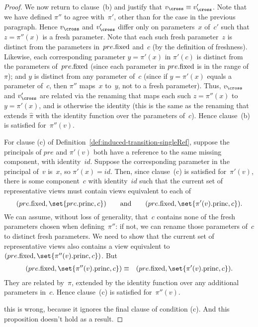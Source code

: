 \begin{proof}
We now return to clause~(b) and justify that $v_\cross \equiv v_\cross'$.
Note that we have defined $\pi''$ to agree with~$\pi'$, other than for the
case in the previous paragraph.  Hence $v_\cross$ and $v_\cross'$ differ only
on parameters~$x$ of~$c'$ such that $z = \pi''(x)$ is a fresh parameter.  Note
that each such fresh parameter~$z$ is distinct from the parameters
in~$pre.\mathrm{fixed}$ and~$c$ (by the definition of freshness).
%
Likewise, each corresponding parameter $y = \pi'(x)$ in $\pi'(c)$ is distinct
from the parameters of~$pre.\mathrm{fixed}$ (since each parameter in $pre.\mathrm{fixed}$ is
in the range of~$\pi$); and $y$ is distinct from any parameter of~$c$
(since if $y = \pi'(x)$ equals a parameter of~$c$, then $\pi''$ maps~$x$
to~$y$, not to a fresh parameter).
%
Thus, $v_\cross$ and $v_\cross'$ are related via the renaming that maps each
such $z = \pi''(x)$ to~$y = \pi'(x)$, and is otherwise the identity (this is
the same as the renaming that extends $\hat\pi$ with the identity function
over the parameters of~$c$).  Hence clause~(b) is satisfied for~$\pi''(v)$.

For clause (c) of Definition~\ref{def:induced-transition-singleRef}, suppose
the principals of $pre$ and $\pi'(v)$ both have a reference to the same
missing component, with identity~$id$.  Suppose the corresponding parameter in
the principal of~$v$ is~$x$, so $\pi'(x) = id$.  Then, since clause~(c) is
satisfied for~$\pi'(v)$, there is some component~$c$ with identity~$id$ such
that the current set of representative views must contain views equivalent to
each of
\[
(pre.\fixed, \set{pre.\princ, c}) \qquad\mbox{and}\qquad
(pre.\fixed, \set{\pi'(v).\princ, c}).
\]
We can assume, without loss of generality, that~$c$ contains none of the fresh
parameters chosen when defining~$\pi''$: if not, we can rename those
parameters of~$c$ to distinct fresh parameters.  We need to show that the
current set of representative views also contains a view equivalent to
$(pre.\fixed, \set{\pi''(v).\princ, c})$.  But
\begin{eqnarray*}
(pre.\fixed, \set{\pi''(v).\princ, c}) & \equiv & 
  (pre.\fixed, \set{\pi'(v).\princ, c}).
\end{eqnarray*}
They are related by~$\hat\pi$, extended by the identity function over any
additional parameters in~$c$.  Hence clause~(c) is satisfied for~$\pi''(v)$.

 this is wrong, because it ignores the final clause of
condition (c).  And this proposition doesn't hold as a result. 
\end{proof}

